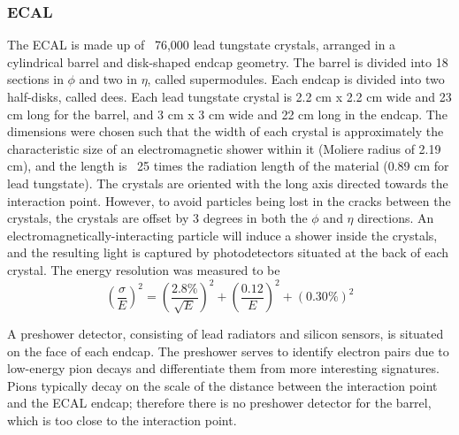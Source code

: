 \subsubsection{ECAL}
\label{exp:ECAL}
The ECAL is made up of ~76,000 lead tungstate crystals,
arranged in a cylindrical barrel and disk-shaped endcap geometry.  
The barrel is divided into 18 sections in $\phi$ and 
two in $\eta$, called supermodules.  
Each endcap is divided into two half-disks, called dees.  
Each lead tungstate crystal is 
2.2 cm x 2.2 cm wide and 23 cm long for the barrel, 
and 3 cm x 3 cm wide and 22 cm long in the endcap.  
The dimensions were chosen such that the width 
of each crystal is approximately the characteristic size of 
an electromagnetic shower within it 
(Moliere radius of 2.19 cm),
and the length is ~25 times the radiation length 
of the material (0.89 cm for lead tungstate).  
The crystals are oriented with the long axis
directed towards the interaction point.  
However, to avoid particles being lost in the cracks 
between the crystals,
the crystals are offset by 3 degrees in both the 
$\phi$ and $\eta$ directions.  
An electromagnetically-interacting particle will 
induce a shower inside the crystals, 
and the resulting light is captured by 
photodetectors situated at the back of each crystal.  
The energy resolution was measured to be 
\[
\left(\frac{\sigma}{E}\right)^2 = \left(\frac{2.8\%}{\sqrt{E}}\right)^2 + \left(\frac{0.12}{E}\right)^2 + \left(0.30\%\right)^2
\]

A preshower detector, consisting of lead radiators 
and silicon sensors, 
is situated on the face of each endcap.  
The preshower serves to identify electron pairs due to low-energy 
pion decays and differentiate them from more 
interesting signatures.  
Pions typically decay on the scale 
of the distance between the interaction point and the 
ECAL endcap;
therefore there is no preshower detector for the barrel, 
which is too close to the interaction point.  

